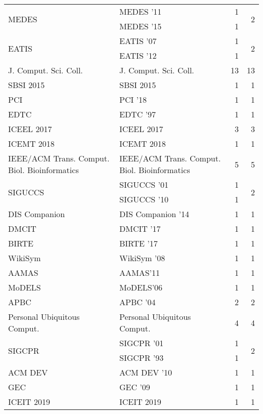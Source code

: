 \begin{table*}[t]
\begin{tabular}{llrr}
\multirow{2}{*}{MEDES } & MEDES '11 & 1 & \multirow{2}{*}{2}\\
& MEDES '15 & 1 &\\
\multirow{2}{*}{EATIS } & EATIS '07 & 1 & \multirow{2}{*}{2}\\
& EATIS '12 & 1 &\\
\multirow{1}{*}{J. Comput. Sci. Coll.} & J. Comput. Sci. Coll. & 13 & \multirow{1}{*}{13}\\
\multirow{1}{*}{SBSI 2015} & SBSI 2015 & 1 & \multirow{1}{*}{1}\\
\multirow{1}{*}{PCI } & PCI '18 & 1 & \multirow{1}{*}{1}\\
\multirow{1}{*}{EDTC } & EDTC '97 & 1 & \multirow{1}{*}{1}\\
\multirow{1}{*}{ICEEL 2017} & ICEEL 2017 & 3 & \multirow{1}{*}{3}\\
\multirow{1}{*}{ICEMT 2018} & ICEMT 2018 & 1 & \multirow{1}{*}{1}\\
\multirow{1}{*}{IEEE/ACM Trans. Comput. Biol. Bioinformatics} & IEEE/ACM Trans. Comput. Biol. Bioinformatics & 5 & \multirow{1}{*}{5}\\
\multirow{2}{*}{SIGUCCS } & SIGUCCS '01 & 1 & \multirow{2}{*}{2}\\
& SIGUCCS '10 & 1 &\\
\multirow{1}{*}{DIS Companion } & DIS Companion '14 & 1 & \multirow{1}{*}{1}\\
\multirow{1}{*}{DMCIT } & DMCIT '17 & 1 & \multirow{1}{*}{1}\\
\multirow{1}{*}{BIRTE } & BIRTE '17 & 1 & \multirow{1}{*}{1}\\
\multirow{1}{*}{WikiSym } & WikiSym '08 & 1 & \multirow{1}{*}{1}\\
\multirow{1}{*}{AAMAS} & AAMAS'11 & 1 & \multirow{1}{*}{1}\\
\multirow{1}{*}{MoDELS} & MoDELS'06 & 1 & \multirow{1}{*}{1}\\
\multirow{1}{*}{APBC } & APBC '04 & 2 & \multirow{1}{*}{2}\\
\multirow{1}{*}{Personal Ubiquitous Comput.} & Personal Ubiquitous Comput. & 4 & \multirow{1}{*}{4}\\
\multirow{2}{*}{SIGCPR } & SIGCPR '01 & 1 & \multirow{2}{*}{2}\\
& SIGCPR '93 & 1 &\\
\multirow{1}{*}{ACM DEV } & ACM DEV '10 & 1 & \multirow{1}{*}{1}\\
\multirow{1}{*}{GEC } & GEC '09 & 1 & \multirow{1}{*}{1}\\
\multirow{1}{*}{ICEIT 2019} & ICEIT 2019 & 1 & \multirow{1}{*}{1}\\

\end{tabular}
\end{table*}
